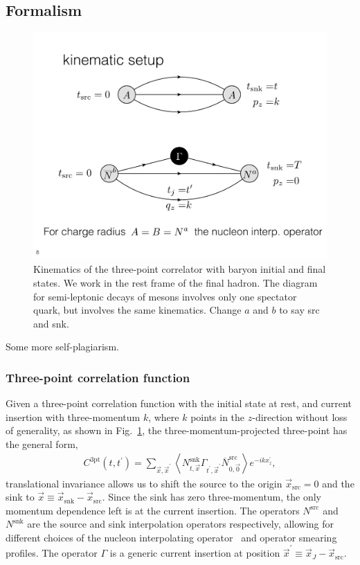 \documentclass[prd,aps,twocolumn,superscriptaddress,tightenlines,nofootinbib,floatfix,preprintnumbers,10pt]{revtex4-1}
\begin{document}
\subsection{Formalism}
\begin{figure}[t]
	\centering
	\includegraphics[width=\columnwidth]{./cropped_kinematics.pdf}
	\caption{Kinematics of the three-point correlator with baryon initial and final states. We work in the rest frame of the final hadron. The diagram for semi-leptonic decays of mesons involves only one spectator quark, but involves the same kinematics. {\color{red} Change $a$ and $b$ to say src and snk.}}
	\label{fig:3pt_kinematics}
\end{figure}
{\color{red} Some more self-plagiarism.}
\subsubsection{Three-point correlation function}
Given a three-point correlation function with the initial state at rest, and current insertion with three-momentum $k$, where $k$ points in the $z$-direction without loss of generality, as shown in Fig.~\ref{fig:3pt_kinematics}, the three-momentum-projected three-point has the general form,
\begin{align}
C^{\text{3pt}}(t, t^\prime) = \sum_{\vec{x},\vec{x}^\prime} \left<N^{\mathrm{snk}}_{t,\vec{x}}\Gamma_{t^\prime,\vec{x}^\prime} \overline{N}^{\mathrm{src}}_{0,\vec{0}}\right> e^{-ikx^\prime_z},
\label{eq:3pt}
\end{align}
translational invariance allows us to shift the source to the origin $\vec{x}_{\mathrm{src}} = 0$ and the sink to $\vec{x}\equiv \vec{x}_{\mathrm{snk}} - \vec{x}_{\mathrm{src}}$. Since the sink has zero three-momentum, the only momentum dependence left is at the current insertion. The operators $N^{\mathrm{src}}$ and $N^{\mathrm{snk}}$ are the source and sink interpolation operators respectively, allowing for different choices of the nucleon interpolating operator~\cite{Basak:2005ir,Basak:2007kj} and operator smearing profiles. The operator $\Gamma$ is a generic current insertion at position $\vec{x}^\prime\equiv \vec{x}_J-\vec{x}_{\text{src}}$.
\end{document}
